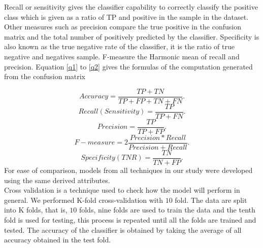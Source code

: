 \documentclass[a4paper,fleqn]{cas-dc}
\begin{document}
Recall or sensitivity gives the classifier capability to correctly classify the positive class which is given as a ratio of TP and positive in the sample in the dataset. Other measures such as precision compare the true positive in the confusion matrix and the total number of positively predicted by the classifier. Specificity is also known as the true negative rate of the classifier, it is the ratio of true negative and negatives sample. F-measure the Harmonic mean of recall and precision. Equation \eqref{q1} to \eqref{q2} gives the  formulas of the  computation generated from the confusion matrix 

\begin{equation}\label{q1}
Accuracy = \frac{TP +TN}{TP +FP +TN+FN} .
\end{equation}
\begin{equation}\label{eqn11}
Recall(Sensitivity) = \frac{TP }{TP +FN}. 
\end{equation}
\begin{equation}\label{eqn12}
Precision = \frac{TP}{TP +FP}.
\end{equation}
\begin{equation}
F-measure = 2\frac{Precision*Recall}{Precision +Recall}.
\end{equation}
\begin{equation}\label{q2}
Specificity (TNR) = \frac{TN}{TN +FP}.
\end{equation}
For ease of comparison, models from all techniques in our study were developed using the same derived attributes.\\

Cross validation is a technique used to check how the model will perform in general. We performed K-fold cross-validation with $10$ fold. The data are split into K folds, that is, $10$ folds, nine folds are used to train the data and the tenth fold is used for testing, this process is repeated until all the folds are trained and tested. The accuracy of the classifier is obtained by taking the average of all accuracy obtained in the test fold. 
\end{document}
